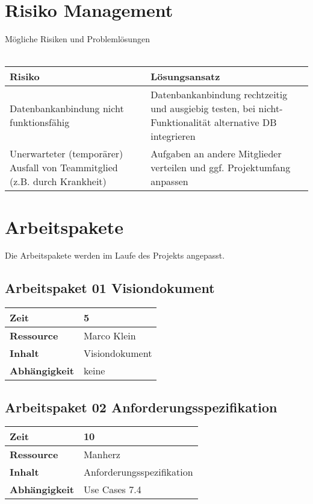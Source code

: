 \documentclass[12pt,a4paper,onecolumn]{article}
\begin{document}
\section{Risiko Management}
Mögliche Risiken und Problemlösungen\\\\
\begin{tabularx}{\textwidth}{|X|X|}
\hline
    \textbf{Risiko} & \textbf{Lösungsansatz}\\
    \hline
    Datenbankanbindung nicht funktionsfähig & Datenbankanbindung rechtzeitig und ausgiebig testen, bei nicht-Funktionalität alternative DB integrieren\\
    \hline
    Unerwarteter (temporärer) Ausfall von Teammitglied (z.B. durch Krankheit) & Aufgaben an andere Mitglieder verteilen und ggf. Projektumfang anpassen\\
    \hline
\end{tabularx}

\section{Arbeitspakete}
Die Arbeitspakete werden im Laufe des Projekts angepasst.

\subsection{Arbeitspaket 01 Visiondokument}
\begin{tabularx}{\textwidth}{|l|X|}
\hline
     \textbf{Zeit} &  5 \\
     \hline
     \textbf{Ressource} & Marco Klein\\
     \hline
     \textbf{Inhalt} & Visiondokument \\
     \hline
     \textbf{Abhängigkeit} &  keine\\
\hline
\end{tabularx}

\subsection{Arbeitspaket 02 Anforderungsspezifikation}
\begin{tabularx}{\textwidth}{|l|X|}
\hline
     \textbf{Zeit} &  10\\
     \hline
     \textbf{Ressource} & Manherz\\
     \hline
     \textbf{Inhalt} & Anforderungsspezifikation \\
     \hline
     \textbf{Abhängigkeit} & Use Cases 7.4\\
\hline
\end{tabularx}
\end{document}
